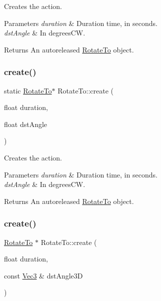 Creates the action.


\begin{DoxyParams}{Parameters}
{\em duration} & Duration time, in seconds. \\
\hline
{\em dst\+Angle} & In degrees\+CW. \\
\hline
\end{DoxyParams}
\begin{DoxyReturn}{Returns}
An autoreleased \hyperlink{classRotateTo}{Rotate\+To} object. 
\end{DoxyReturn}
\mbox{\label{classRotateTo_a97900b213107e0fb11fd0d8509d5e24c}} 
\subsubsection{\texorpdfstring{create()}{create()}\hspace{0.1cm}{\footnotesize\ttfamily [4/6]}}
{\footnotesize\ttfamily static \hyperlink{classRotateTo}{Rotate\+To}$\ast$ Rotate\+To\+::create (\begin{DoxyParamCaption}\item[{float}]{duration,  }\item[{float}]{dst\+Angle }\end{DoxyParamCaption})\hspace{0.3cm}{\ttfamily [static]}}

Creates the action.


\begin{DoxyParams}{Parameters}
{\em duration} & Duration time, in seconds. \\
\hline
{\em dst\+Angle} & In degrees\+CW. \\
\hline
\end{DoxyParams}
\begin{DoxyReturn}{Returns}
An autoreleased \hyperlink{classRotateTo}{Rotate\+To} object. 
\end{DoxyReturn}
\mbox{\label{classRotateTo_aa75725b759f446f9f972ebd2f66b5870}} 
\subsubsection{\texorpdfstring{create()}{create()}\hspace{0.1cm}{\footnotesize\ttfamily [5/6]}}
{\footnotesize\ttfamily \hyperlink{classRotateTo}{Rotate\+To} $\ast$ Rotate\+To\+::create (\begin{DoxyParamCaption}\item[{float}]{duration,  }\item[{const \hyperlink{classVec3}{Vec3} \&}]{dst\+Angle3D }\end{DoxyParamCaption})\hspace{0.3cm}{\ttfamily [static]}}


